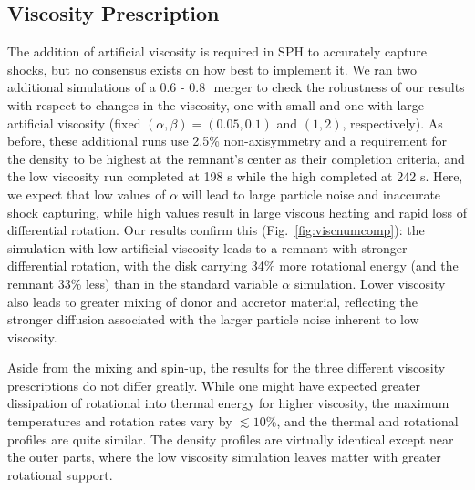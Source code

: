 \subsection{Viscosity Prescription}
\label{ssec:viscprescrip}

The addition of artificial viscosity is required in SPH to accurately capture shocks, but no consensus exists on how best to implement it.  We ran two additional simulations of a 0.6 - 0.8\,\Msun\ merger to check the robustness of our results with respect to changes in the viscosity, one with small and one with large artificial viscosity (fixed $(\alpha,\beta)=(0.05,0.1)$ and $(1,2)$, respectively).  As before, these additional runs use 2.5\% non-axisymmetry and a requirement for the density to be highest at the remnant's center as their completion criteria, and the low viscosity run completed at 198 s while the high completed at 242 s.  Here, we expect that low values of $\alpha$ will lead to large particle noise and inaccurate shock capturing, while high values result in large viscous heating and rapid loss of differential rotation.  Our results confirm this (Fig.~\ref{fig:viscnumcomp}): the simulation with low artificial viscosity leads to a remnant with stronger differential rotation, with the disk carrying 34\% more rotational energy (and the remnant 33\% less) than in the standard variable $\alpha$ simulation.  Lower viscosity also leads to greater mixing of donor and accretor material, reflecting the stronger diffusion associated with the larger particle noise inherent to low viscosity.

Aside from the mixing and spin-up, the results for the three different viscosity prescriptions do not differ greatly.  While one might have expected greater dissipation of rotational into thermal energy for higher viscosity, the maximum temperatures and rotation rates vary by $\lesssim\!10$\%, and the thermal and rotational profiles are quite similar.  The density profiles are virtually identical except near the outer parts, where the low viscosity simulation leaves matter with greater rotational support.  


